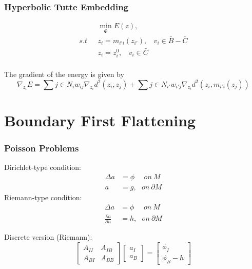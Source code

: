 \documentclass{beamer}
\begin{document}
\begin{frame}
\frametitle{Hyperbolic Tutte Embedding}
\begin{equation}
\begin{split}
&\min_{\Phi} E(z),\\
s.t \ \ \ &z_i = m_{i'i}(z_{i'}), \ \ \ \ v_i \in \bar{B} - \bar{C}\\
 &z_i = z_i^0, \ \ \ \ v_i \in \bar{C}\\
\end{split}
\nonumber
\end{equation}

The gradient of the energy is given by
\begin{equation}
\nabla_{z_i} E = \sum{j\in N_i}  w_{ij}\nabla_{z_i}d^2(z_i, z_j) + \sum{j\in N_{i'}}w_{i'j}\nabla_{z_i}d^2(z_i, m_{i'i}(z_j))
\nonumber
\end{equation}

\end{frame}



\section{Boundary First Flattening}
\begin{frame}
\frametitle{Poisson Problems}
Dirichlet-type condition:
\begin{equation}
\begin{split}
\Delta a &= \phi \ \ \ \ \ \  on\  M\\
a &= g , \ \ \  on\ \partial M
\end{split}
\end{equation}
Riemann-type condition:
\begin{equation}
\begin{split}
\Delta a &= \phi \ \ \ \ \ \  on\  M\\
\frac{\partial a}{\partial n} &= h , \ \ \  on\ \partial M 
\end{split}
\end{equation}

Discrete version (Riemann):
\begin{equation}
\left[\begin{matrix}
A_{II} & A_{IB}\\
A_{BI} & A_{BB}
\end{matrix}\right] \left[\begin{matrix}
a_I\\
a_B
\end{matrix}\right]
= \left[\begin{matrix}
\phi_I\\
\phi_B - h\end{matrix}\right]
\label{eq:relation}
\end{equation}

\end{frame}
\end{document}
